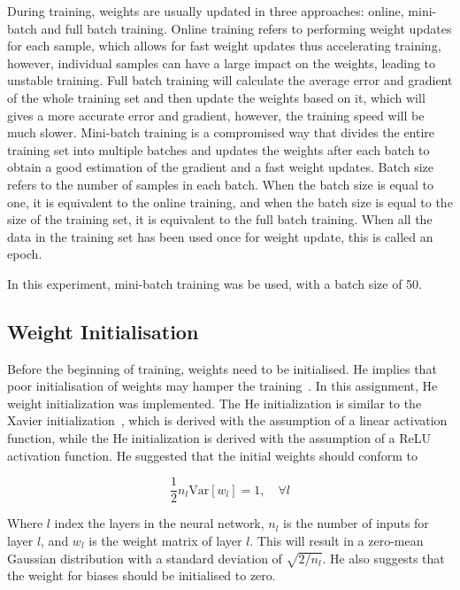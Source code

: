 \documentclass[conference]{IEEEtran}
\begin{document}
During training, weights are usually updated in three approaches: online, mini-batch and full batch training. Online training refers to performing weight updates for each sample, which allows for fast weight updates thus accelerating training, however, individual samples can have a large impact on the weights, leading to unstable training. Full batch training will calculate the average error and gradient of the whole training set and then update the weights based on it, which will gives a more accurate error and gradient, however, the training speed will be much slower. Mini-batch training is a compromised way that divides the entire training set into multiple batches and updates the weights after each batch to obtain a good estimation of the gradient and a fast weight updates. Batch size refers to the number of samples in each batch. When the batch size is equal to one, it is equivalent to the online training, and when the batch size is equal to the size of the training set, it is equivalent to the full batch training. When all the data in the training set has been used once for weight update, this is called an epoch.

In this experiment, mini-batch training was be used, with a batch size of 50.

\subsection{Weight Initialisation}

Before the beginning of training, weights need to be initialised. He implies that poor initialisation of weights may hamper the training~\cite{he2015delving}. In this assignment, He weight initialization\cite{he2015delving} was implemented. The He initialization is similar to the Xavier initialization~\cite{glorot2010understanding}, which is derived with the assumption of a linear activation function, while the He initialization is derived with the assumption of a ReLU activation function. He suggested that the initial weights should conform to

\begin{equation}
    \frac{1}{2}n_l \textrm{Var}[w_l] = 1,\quad \forall l
\end{equation}

Where \(l\) index the layers in the neural network, \(n_l\) is the number of inputs for layer \(l\), and \(w_l\) is the weight matrix of layer \(l\). This will result in a zero-mean Gaussian distribution with a standard deviation of \(\sqrt{2/n_l}\). He also suggests that the weight for biases should be initialised to zero.
\end{document}
